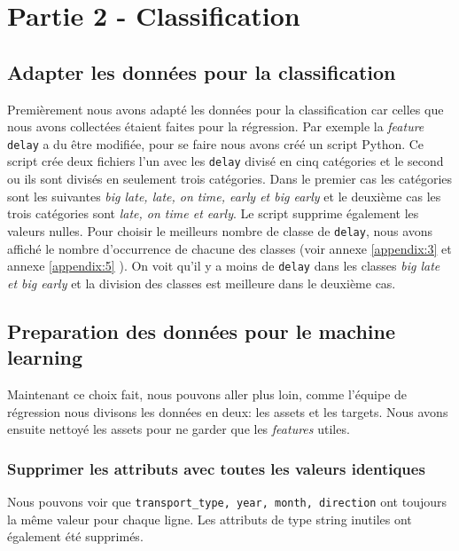 \section{Partie 2 - Classification}
\subsection{Adapter les données pour la classification}
Premièrement nous avons adapté les données pour la classification car celles que nous avons collectées étaient faites pour la régression. Par exemple la \textit{feature} \lstinline!delay! a du être modifiée, pour se faire nous avons créé un script Python. Ce script crée deux fichiers l'un avec les \lstinline!delay! divisé en cinq catégories et le second ou ils sont divisés en seulement trois catégories. Dans le premier cas les catégories sont les suivantes \textit{big late, late, on time, early et big early} et le deuxième cas les trois catégories sont \textit{late, on time et early}. Le script supprime également les valeurs nulles. Pour choisir le meilleurs nombre de classe de \lstinline!delay!, nous avons affiché le nombre d'occurrence de chacune des classes (voir annexe \ref{appendix:3} et annexe \ref{appendix:5} ). On voit qu'il y a moins de \lstinline!delay! dans les classes \textit{big late et big early} et la division des classes est meilleure dans le deuxième cas.


\subsection{Preparation des données pour le machine learning}
Maintenant ce choix fait, nous pouvons aller plus loin, comme l'équipe de régression nous divisons les données en deux: les assets et les targets. Nous avons ensuite nettoyé les assets pour ne garder que les \textit{features} utiles.

\subsubsection{Supprimer les attributs avec toutes les valeurs identiques}


Nous pouvons voir que \lstinline!transport_type, year, month, direction! ont toujours la même valeur pour chaque ligne. Les attributs de type string inutiles ont également été supprimés.

